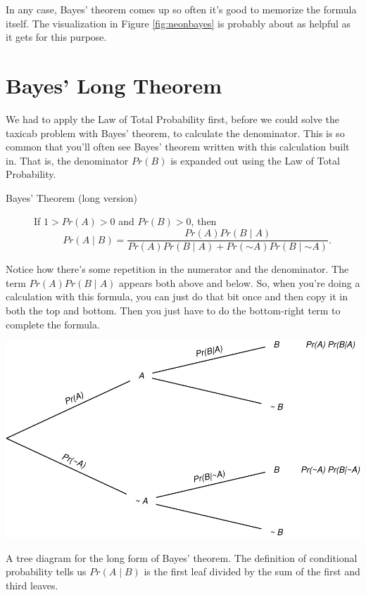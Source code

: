 \documentclass[justified]{tufte-book}
\newcommand{\given}{\mid}
\renewcommand{\neg}{\mathbin{\sim}}
\newcommand{\p}{Pr}
\theoremstyle{definition}
\theoremstyle{definition}
\theoremstyle{definition}
\theoremstyle{definition}
\theoremstyle{remark}
\begin{document}
In any case, Bayes' theorem comes up so often it's good to memorize the formula itself. The visualization in Figure \ref{fig:neonbayes} is probably about as helpful as it gets for this purpose.

\hypertarget{bayes-long-theorem}{%
\section{Bayes' Long Theorem}\label{bayes-long-theorem}}

We had to apply the Law of Total Probability first, before we could solve the taxicab problem with Bayes' theorem, to calculate the denominator. This is so common that you'll often see Bayes' theorem written with this calculation built in. That is, the denominator \(\p(B)\) is expanded out using the Law of Total Probability.

\begin{description}
\item[Bayes' Theorem (long version)]
If \(1 > \p(A) > 0\) and \(\p(B)>0\), then
\[ \p(A \given B) = \frac{\p(A)\p(B \given A)}{\p(A)\p(B \given A) + \p(\neg A)\p(B \given \neg A)}. \]
\end{description}

Notice how there's some repetition in the numerator and the denominator. The term \(\p(A)\p(B \given A)\) appears both above and below. So, when you're doing a calculation with this formula, you can just do that bit once and then copy it in both the top and bottom. Then you just have to do the bottom-right term to complete the formula.

\begin{marginfigure}
\includegraphics{_main_files/figure-latex/longbayestree-1} \caption[A tree diagram for the long form of Bayes' theorem]{A tree diagram for the long form of Bayes' theorem. The definition of conditional probability tells us $\p(A \given B)$ is the first leaf divided by the sum of the first and third leaves.}\label{fig:longbayestree}
\end{marginfigure}
\end{document}
